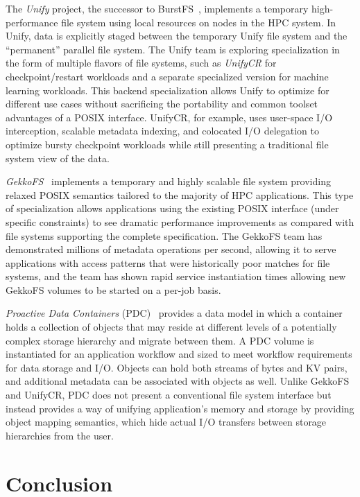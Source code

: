 \documentclass[11pt]{article}
\begin{document}
The \textit{Unify} project, the successor to BurstFS~\cite{Wang2016},
implements a temporary high-performance file system using
local resources on nodes in the HPC system. In Unify, data is
explicitly staged between the temporary Unify file system and the
``permanent'' parallel file system. The Unify team is exploring
specialization in the form of multiple flavors of file systems, such
as \textit{UnifyCR} for
checkpoint/restart workloads and a
separate specialized version for machine learning workloads. This backend
specialization allows Unify to optimize for different use cases without
sacrificing the portability and common toolset advantages of a POSIX
interface. UnifyCR, for example, uses user-space I/O interception,
scalable metadata indexing, and colocated I/O delegation to optimize
bursty checkpoint workloads while still presenting a traditional file
system view of the data.

\textit{GekkoFS}~\cite{Vef2018} implements a temporary and
highly scalable file system providing relaxed POSIX semantics tailored
to the majority of HPC applications. This type of specialization
allows applications using the existing POSIX interface (under
specific constraints) to see dramatic performance improvements
as compared with file systems supporting the complete specification. The
GekkoFS team has demonstrated millions of metadata operations per
second, allowing it to serve applications with access patterns that
were historically poor matches for file systems, and the team has shown rapid
service instantiation times allowing new GekkoFS volumes to be started
on a per-job basis.

\textit{Proactive Data Containers} (PDC)~\cite{Mu2018} provides a data
model in which a container holds a collection of objects that may
reside at different levels of a potentially complex storage hierarchy and
migrate between them. A PDC volume is instantiated for an application
workflow and sized to meet workflow requirements for data storage
and I/O. Objects can hold both streams of bytes and KV pairs,
and additional metadata can be associated with objects as well.
Unlike GekkoFS and UnifyCR, PDC does not present a conventional file
system interface but instead provides a way of unifying application's memory
and storage by providing object mapping semantics, which hide actual I/O transfers
between storage hierarchies from the user.

\section{Conclusion}
\label{sec:concl}
\end{document}
